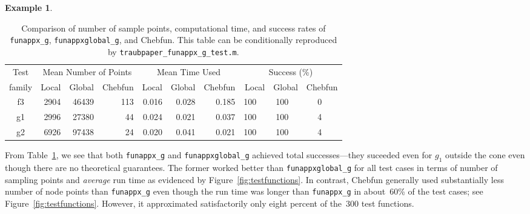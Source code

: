 \documentclass[review]{elsarticle}
\theoremstyle{definition}
\newtheorem{exmp}{Example}
\newcommand{\funappxg}{\texttt{funappx\_g}\xspace}
\newcommand{\funappxglobalg}{\texttt{funappxglobal\_g\xspace}}
\begin{document}
\begin{exmp}
%
\begin{table}[bth]
\centering
\caption{Comparison of number of sample points, computational time,  and success
rates of \funappxg, \funappxglobalg, and Chebfun. 
This table can be conditionally reproduced by
\texttt{traubpaper\_funappx\_g\_test.m}.}
\label{tab:localVsGlobalVsChebfun}
{\footnotesize
\setlength{\tabcolsep}{.5em} %
\begin{tabular}{|c|rrr|rrr|rrrrrr|}
\hline
    Test      &     \multicolumn{3}{c|}{Mean Number of Points} & \multicolumn{3}{c|}{Mean Time Used}  & \multicolumn{6}{|c|}{Success (\%)} 
\\  family &  Local  &  Global    &  Chebfun    & Local     &  Global     & Chebfun      & \multicolumn{2}{r}{Local} & \multicolumn{2}{r}{Global} & \multicolumn{2}{r|}{Chebfun}
\\ \hline
          f3   &   2904  &   46439   &   113    &   0.016   &     0.028    &   0.185 &    100   &    &  100   &   &  0   &     
\\        g1   &   2996  &   27380   &    44    &   0.024   &     0.021    &   0.037 &    100   &    &  100   &   &  4   &  
\\        g2   &   6926  &   97438   &    24    &   0.020   &     0.041    &   0.021 &    100   &    &  100   &   &  4   &          
\\ \hline	
\end{tabular}
}
\end{table}
%

From Table~\ref{tab:localVsGlobalVsChebfun}, we see that both \funappxg{} and
\funappxglobalg{} achieved total successes---they suceeded
even for  $g_1$ outside the cone even though there are no theoretical guarantees.
The former worked better than
\funappxglobalg{} for all test cases in terms of number of sampling points and
\emph{average} run time as evidenced by Figure~\ref{fig:testfunctions}.
In contrast, Chebfun generally used substantially less number of node points
than \funappxg{} even though the run time was longer than \funappxg{} in
about~60\% of the test cases; see Figure~\ref{fig:testfunctions}.
However, it approximated satisfactorily only eight percent of the~300 test
functions.



\end{exmp}
\end{document}
